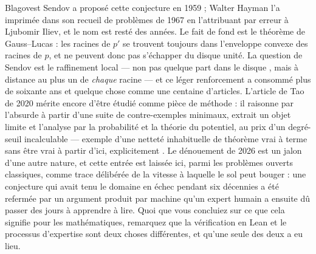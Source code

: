 \documentclass[11pt]{article}
\begin{document}
\noindent Blagovest Sendov a proposé cette conjecture en 1959 ; Walter Hayman l'a
imprimée dans son recueil de problèmes de 1967 en l'attribuant par erreur à Ljubomir Iliev,
et le nom est resté des années. Le fait de fond est le théorème de Gauss--Lucas : les racines
de $ p' $ se trouvent toujours dans l'enveloppe convexe des racines de $ p $, et ne
peuvent donc pas s'échapper du disque unité. La question de Sendov est le raffinement local
--- non pas \og{} quelque part dans le disque \fg{}, mais \og{} à distance au plus un de \textit{chaque}
racine \fg{} --- et ce léger renforcement a consommé plus de soixante ans et quelque chose comme
une centaine d'articles. L'article de Tao de 2020 mérite encore d'être étudié comme pièce
de méthode : il raisonne par l'absurde à partir d'une suite de contre-exemples minimaux,
extrait un objet limite et l'analyse par la probabilité et la théorie du potentiel, au prix
d'un degré-seuil incalculable --- exemple d'une netteté inhabituelle de théorème vrai
\og{} à terme \fg{} sans être vrai \og{} à partir d'ici, explicitement \fg{}. Le dénouement de 2026 est un
jalon d'une autre nature, et cette entrée est laissée ici, parmi les problèmes ouverts
classiques, comme trace délibérée de la vitesse à laquelle le sol peut bouger : une
conjecture qui avait tenu le domaine en échec pendant six décennies a été refermée par un
argument produit par machine qu'un expert humain a ensuite dû passer des jours à apprendre
à lire. Quoi que vous concluiez sur ce que cela signifie pour les mathématiques, remarquez
que la vérification en Lean et le processus d'expertise sont deux choses différentes, et
qu'une seule des deux a eu lieu.
\end{document}
